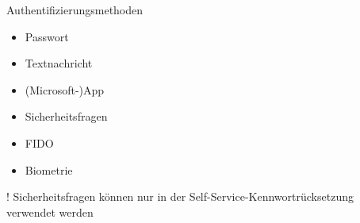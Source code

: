 
\begin{flashcard}[Definition]{Authentifizierungsmethoden}
    \begin{itemize}
        \item Passwort
        \item Textnachricht
        \item (Microsoft-)App
        \item Sicherheitsfragen
        \item FIDO
        \item Biometrie
    \end{itemize}
    \vspace{1cm}
    ! Sicherheitsfragen können nur in der Self-Service-Kennwortrücksetzung verwendet werden
\end{flashcard}


